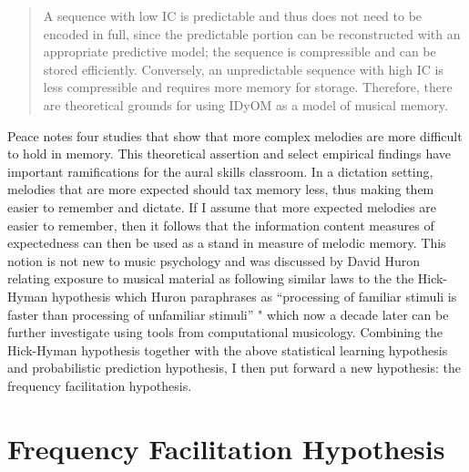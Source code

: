 \documentclass[]{book}
\begin{document}
\begin{quote}
A sequence with low IC is predictable and thus does not need to be encoded in full, since the predictable portion can be reconstructed with an appropriate predictive model; the sequence is compressible and can be stored efficiently. Conversely, an unpredictable sequence with high IC is less compressible and requires more memory for storage. Therefore, there are theoretical grounds for using IDyOM as a model of musical memory.
\end{quote}

Peace notes four studies \citep{bartlettRecognitionTransposedMelodies1980, cohenRecognitionTransposedTone1977, cuddyMusicalPatternRecognition1981, halpernAgingExperienceRecognition1995} that show that more complex melodies are more difficult to hold in memory.
This theoretical assertion and select empirical findings have important ramifications for the aural skills classroom.
In a dictation setting, melodies that are more expected should tax memory less, thus making them easier to remember and dictate.
If I assume that more expected melodies are easier to remember, then it follows that the information content measures of expectedness can then be used as a stand in measure of melodic memory.
This notion is not new to music psychology and was discussed by David Huron relating exposure to musical material as following similar laws to the the Hick-Hyman hypothesis \citep{hickRateGainInformation1952, hymanStimulusInformationDeterminant1953} which Huron paraphrases as ``processing of familiar stimuli is faster than processing of unfamiliar stimuli'' \citep[pp.~63]{huronSweetAnticipation2006}" which now a decade later can be further investigate using tools from computational musicology.
Combining the Hick-Hyman hypothesis together with the above statistical learning hypothesis and probabilistic prediction hypothesis, I then put forward a new hypothesis: the frequency facilitation hypothesis.

\hypertarget{frequency-facilitation-hypothesis}{%
\section{Frequency Facilitation Hypothesis}\label{frequency-facilitation-hypothesis}}
\end{document}
